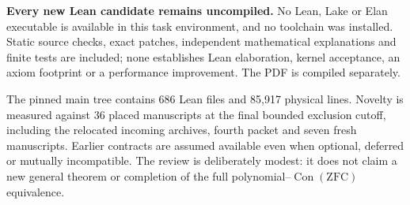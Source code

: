 \textbf{Every new Lean candidate remains uncompiled.} No Lean, Lake or Elan executable is available in this task environment, and no toolchain was installed. Static source checks, exact patches, independent mathematical explanations and finite tests are included; none establishes Lean elaboration, kernel acceptance, an axiom footprint or a performance improvement. The PDF is compiled separately.

The pinned main tree contains 686 Lean files and 85,917 physical lines. Novelty is measured against 36 placed manuscripts at the final bounded exclusion cutoff, including the relocated incoming archives, fourth packet and seven fresh manuscripts. Earlier contracts are assumed available even when optional, deferred or mutually incompatible. The review is deliberately modest: it does not claim a new general theorem or completion of the full polynomial--$\operatorname{Con}(\mathrm{ZFC})$ equivalence.
